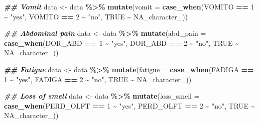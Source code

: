 \documentclass[
]{article}
\newenvironment{Shaded}{\begin{snugshade}}{\end{snugshade}}
\newcommand{\AttributeTok}[1]{\textcolor[rgb]{0.13,0.29,0.53}{#1}}
\newcommand{\ConstantTok}[1]{\textcolor[rgb]{0.56,0.35,0.01}{#1}}
\newcommand{\DecValTok}[1]{\textcolor[rgb]{0.00,0.00,0.81}{#1}}
\newcommand{\DocumentationTok}[1]{\textcolor[rgb]{0.56,0.35,0.01}{\textbf{\textit{#1}}}}
\newcommand{\FunctionTok}[1]{\textcolor[rgb]{0.13,0.29,0.53}{\textbf{#1}}}
\newcommand{\NormalTok}[1]{#1}
\newcommand{\OtherTok}[1]{\textcolor[rgb]{0.56,0.35,0.01}{#1}}
\newcommand{\SpecialCharTok}[1]{\textcolor[rgb]{0.81,0.36,0.00}{\textbf{#1}}}
\newcommand{\StringTok}[1]{\textcolor[rgb]{0.31,0.60,0.02}{#1}}
\begin{document}
\begin{Shaded}
\begin{Highlighting}[]
\DocumentationTok{\#\# Vomit}
\NormalTok{data }\OtherTok{\textless{}{-}}\NormalTok{  data }\SpecialCharTok{\%\textgreater{}\%}
  \FunctionTok{mutate}\NormalTok{(}\AttributeTok{vomit =} \FunctionTok{case\_when}\NormalTok{(VOMITO }\SpecialCharTok{==} \DecValTok{1} \SpecialCharTok{\textasciitilde{}} \StringTok{"yes"}\NormalTok{,}
\NormalTok{                              VOMITO }\SpecialCharTok{==} \DecValTok{2} \SpecialCharTok{\textasciitilde{}} \StringTok{"no"}\NormalTok{,}
                              \ConstantTok{TRUE} \SpecialCharTok{\textasciitilde{}} \ConstantTok{NA\_character\_}\NormalTok{))}


\DocumentationTok{\#\# Abdominal pain}
\NormalTok{data }\OtherTok{\textless{}{-}}\NormalTok{  data }\SpecialCharTok{\%\textgreater{}\%}
  \FunctionTok{mutate}\NormalTok{(}\AttributeTok{abd\_pain =} \FunctionTok{case\_when}\NormalTok{(DOR\_ABD }\SpecialCharTok{==} \DecValTok{1} \SpecialCharTok{\textasciitilde{}} \StringTok{"yes"}\NormalTok{,}
\NormalTok{                              DOR\_ABD }\SpecialCharTok{==} \DecValTok{2} \SpecialCharTok{\textasciitilde{}} \StringTok{"no"}\NormalTok{,}
                              \ConstantTok{TRUE} \SpecialCharTok{\textasciitilde{}} \ConstantTok{NA\_character\_}\NormalTok{))}

\DocumentationTok{\#\# Fatigue}
\NormalTok{data }\OtherTok{\textless{}{-}}\NormalTok{  data }\SpecialCharTok{\%\textgreater{}\%}
  \FunctionTok{mutate}\NormalTok{(}\AttributeTok{fatigue =} \FunctionTok{case\_when}\NormalTok{(FADIGA }\SpecialCharTok{==} \DecValTok{1} \SpecialCharTok{\textasciitilde{}} \StringTok{"yes"}\NormalTok{,}
\NormalTok{                              FADIGA }\SpecialCharTok{==} \DecValTok{2} \SpecialCharTok{\textasciitilde{}} \StringTok{"no"}\NormalTok{,}
                              \ConstantTok{TRUE} \SpecialCharTok{\textasciitilde{}} \ConstantTok{NA\_character\_}\NormalTok{))}

\DocumentationTok{\#\# Loss of smell}
\NormalTok{data }\OtherTok{\textless{}{-}}\NormalTok{  data }\SpecialCharTok{\%\textgreater{}\%}
  \FunctionTok{mutate}\NormalTok{(}\AttributeTok{loss\_smell =} \FunctionTok{case\_when}\NormalTok{(PERD\_OLFT }\SpecialCharTok{==} \DecValTok{1} \SpecialCharTok{\textasciitilde{}} \StringTok{"yes"}\NormalTok{,}
\NormalTok{                              PERD\_OLFT }\SpecialCharTok{==} \DecValTok{2} \SpecialCharTok{\textasciitilde{}} \StringTok{"no"}\NormalTok{,}
                              \ConstantTok{TRUE} \SpecialCharTok{\textasciitilde{}} \ConstantTok{NA\_character\_}\NormalTok{))}


\end{Highlighting}
\end{Shaded}
\end{document}
